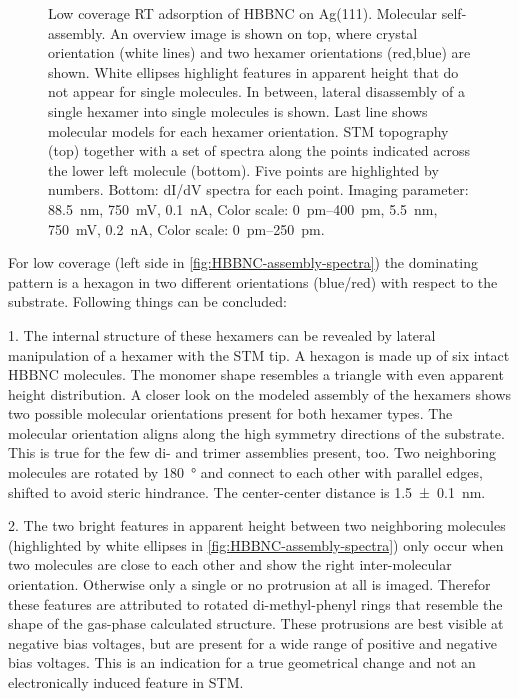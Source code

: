 \begin{figure}[]
	\caption{Low coverage RT adsorption of HBBNC on Ag(111).  Molecular self-assembly. An overview image is shown on top, where crystal orientation (white lines) and two hexamer orientations (red,blue) are shown. White ellipses highlight features in apparent height that do not appear for single molecules. In between, lateral disassembly of a single hexamer into single molecules is shown. Last line shows molecular models for each hexamer orientation.  STM topography (top) together with a set of spectra along the points indicated across the lower left molecule (bottom). Five points are highlighted by numbers. Bottom: dI/dV spectra for each point. Imaging parameter:  \SI{88.5}{\nano \meter}, \SI{750}{\milli \volt}, \SI{0.1}{\nano \ampere}, Color scale: \SIrange{0}{400}{\pico \meter},  \SI{5.5}{\nano \meter}, \SI{750}{\milli \volt}, \SI{0.2}{\nano \ampere}, Color scale: \SIrange{0}{250}{\pico \meter}.}
	\label{fig:HBBNC-assembly-spectra}
\end{figure}
For low coverage (left side in \autoref{fig:HBBNC-assembly-spectra}) the dominating pattern is a hexagon in two different orientations (blue/red) with respect to the substrate.  Following things can be concluded: 

1. The internal structure of these hexamers can be revealed by lateral manipulation of a hexamer with the STM tip. A hexagon is made up of six intact HBBNC molecules. The monomer shape resembles a triangle with even apparent height distribution. A closer look on the modeled assembly of the hexamers shows two possible molecular orientations present for both hexamer types. The molecular orientation aligns along the high symmetry directions of the substrate. This is true for the few di- and trimer assemblies present, too. Two neighboring molecules are rotated by \SI{180}{\degree} and connect to each other with parallel edges, shifted to avoid steric hindrance. The center-center distance is \SI{1.5 \pm 0.1}{\nano \meter}. 

2. The two bright features in apparent height between two neighboring molecules (highlighted by white ellipses in \autoref{fig:HBBNC-assembly-spectra}) only occur when two molecules are close to each other and show the right inter-molecular orientation. Otherwise only a single or no protrusion at all is imaged. Therefor these features are attributed to rotated di-methyl-phenyl rings that resemble the shape of the gas-phase calculated structure. These protrusions are best visible at negative bias voltages, but are present for a wide range of positive and negative bias voltages. This is an indication for a true geometrical change and not an electronically induced feature in STM.

